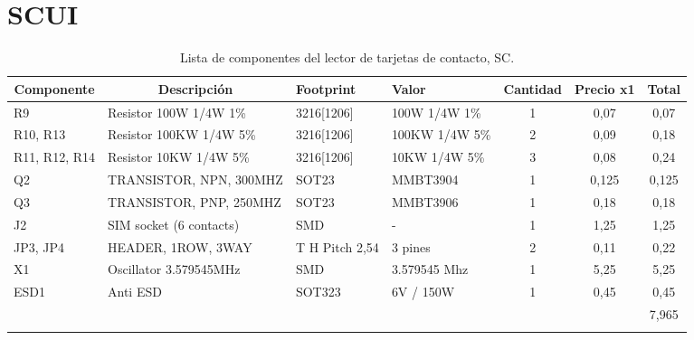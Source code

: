 \section{SCUI}
\begin{longtable}{|l|p{2.5cm}|p{2cm}|p{2cm}|c|c|c|}
\hline
\multicolumn{1}{|c|}{\textbf{Componente}} & \multicolumn{1}{c|}{\textbf{Descripción}} & \textbf{ Footprint} & \textbf{Valor} & \textbf{Cantidad} & \textbf{Precio x1} & \textbf{Total} \\ \hline
R9 & Resistor 100W 1/4W 1\%  & 3216[1206] & 100W 1/4W  1\% & 1 & 0,07 & 0,07 \\ \hline
R10, R13 & Resistor 100KW 1/4W 5\%  & 3216[1206] & 100KW 1/4W   5\% & 2 & 0,09 & 0,18 \\ \hline
R11, R12, R14 & Resistor 10KW 1/4W 5\%  & 3216[1206] & 10KW 1/4W   5\% & 3 & 0,08 & 0,24 \\ \hline
Q2 & TRANSISTOR, NPN, 300MHZ & SOT23 & MMBT3904 & 1 & 0,125 & 0,125 \\ \hline
Q3 & TRANSISTOR, PNP, 250MHZ & SOT23 & MMBT3906 & 1 & 0,18 & 0,18 \\ \hline
J2 & SIM socket (6 contacts) & SMD & - & 1 & 1,25 & 1,25 \\ \hline
JP3, JP4 & HEADER, 1ROW, 3WAY & T H Pitch 2,54 & 3 pines & 2 & 0,11 & 0,22 \\ \hline
X1 & Oscillator 3.579545MHz & SMD & 3.579545 Mhz & 1 & 5,25 & 5,25 \\ \hline
ESD1 & Anti ESD & SOT323 & 6V / 150W & 1 & 0,45 & 0,45 \\ \hline
 &  & \multicolumn{1}{l|}{} & \multicolumn{1}{l|}{} & \multicolumn{1}{l|}{} & \multicolumn{1}{l|}{} & 7,965 \\ \hline
\caption{Lista de componentes del lector de tarjetas de contacto, SC.}
\label{}
\end{longtable}

